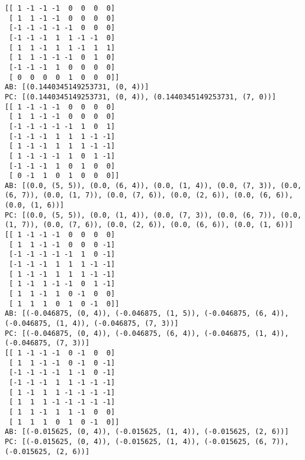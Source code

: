 \begin{lstlisting}
[[ 1 -1 -1 -1  0  0  0  0]
 [ 1  1 -1 -1  0  0  0  0]
 [-1 -1 -1 -1 -1  0  0  0]
 [-1 -1 -1  1  1 -1 -1  0]
 [ 1  1 -1  1  1 -1  1  1]
 [ 1  1 -1 -1 -1  0  1  0]
 [-1 -1 -1  1  0  0  0  0]
 [ 0  0  0  0  1  0  0  0]]
AB: [(0.1440345149253731, (0, 4))]
PC: [(0.1440345149253731, (0, 4)), (0.1440345149253731, (7, 0))]
[[ 1 -1 -1 -1  0  0  0  0]
 [ 1  1 -1 -1  0  0  0  0]
 [-1 -1 -1 -1 -1  1  0  1]
 [-1 -1 -1  1  1  1 -1 -1]
 [ 1 -1 -1  1  1  1 -1 -1]
 [ 1 -1 -1 -1  1  0  1 -1]
 [-1 -1 -1  1  0  1  0  0]
 [ 0 -1  1  0  1  0  0  0]]
AB: [(0.0, (5, 5)), (0.0, (6, 4)), (0.0, (1, 4)), (0.0, (7, 3)), (0.0, (6, 7)), (0.0, (1, 7)), (0.0, (7, 6)), (0.0, (2, 6)), (0.0, (6, 6)), (0.0, (1, 6))]
PC: [(0.0, (5, 5)), (0.0, (1, 4)), (0.0, (7, 3)), (0.0, (6, 7)), (0.0, (1, 7)), (0.0, (7, 6)), (0.0, (2, 6)), (0.0, (6, 6)), (0.0, (1, 6))]
[[ 1 -1 -1 -1  0  0  0  0]
 [ 1  1 -1 -1  0  0  0 -1]
 [-1 -1 -1 -1 -1  1  0 -1]
 [-1 -1 -1  1  1  1 -1 -1]
 [ 1 -1 -1  1  1  1 -1 -1]
 [ 1 -1  1 -1 -1  0  1 -1]
 [ 1  1 -1  1  0 -1  0  0]
 [ 1  1  1  0  1  0 -1  0]]
AB: [(-0.046875, (0, 4)), (-0.046875, (1, 5)), (-0.046875, (6, 4)), (-0.046875, (1, 4)), (-0.046875, (7, 3))]
PC: [(-0.046875, (0, 4)), (-0.046875, (6, 4)), (-0.046875, (1, 4)), (-0.046875, (7, 3))]
[[ 1 -1 -1 -1  0 -1  0  0]
 [ 1  1 -1 -1  0 -1  0 -1]
 [-1 -1 -1 -1  1 -1  0 -1]
 [-1 -1 -1  1  1 -1 -1 -1]
 [ 1 -1  1  1 -1 -1 -1 -1]
 [ 1  1  1 -1 -1 -1 -1 -1]
 [ 1  1 -1  1  1 -1  0  0]
 [ 1  1  1  0  1  0 -1  0]]
AB: [(-0.015625, (0, 4)), (-0.015625, (1, 4)), (-0.015625, (2, 6))]
PC: [(-0.015625, (0, 4)), (-0.015625, (1, 4)), (-0.015625, (6, 7)), (-0.015625, (2, 6))]
\end{lstlisting}
